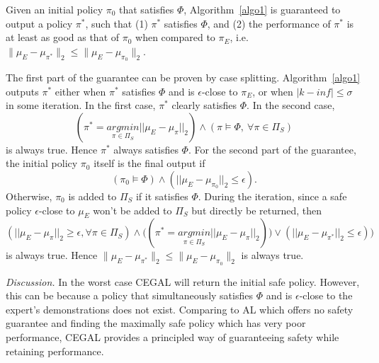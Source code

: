 \begin{theorem}
Given an initial policy $\pi_0$ that satisfies $\Phi$, Algorithm~\ref{algo1} is guaranteed to output a policy $\pi^*$, such that (1) $\pi^*$ satisfies $\Phi$, and 
(2) the performance of $\pi^*$ is at least as good as that of $\pi_0$ when compared to $\pi_E$, i.e. $\|\mu_E - \mu_{\pi^*}\|_2\leq\|\mu_E - \mu_{\pi_0}\|_2$. 
\end{theorem}
The first part of the guarantee can be proven by case splitting. Algorithm~\ref{algo1} outputs $\pi^*$ either when $\pi^*$ satisfies $\Phi$ and is {$\epsilon$-close} to $\pi_E$, or when $|k-inf|\leq \sigma$ in some iteration. 
In the first case, $\pi^*$ clearly satisfies $\Phi$. 
In the second case,  
\begin{equation}
(\pi^*=\underset{{\pi}\in\Pi_S}{argmin}||\mu_E - \mu_{{\pi}}||_2)\wedge(\pi\models\Phi,\ \forall\pi\in\Pi_S)
\end{equation}
is always true. Hence $\pi^*$ always satisfies $\Phi$. For the second part of the guarantee, the initial policy $\pi_0$ itself is the final output if
\begin{equation}
(\pi_0\models\Phi)\wedge(||\mu_E-\mu_{\pi_0}||_2\leq\epsilon). 
\end{equation}
Otherwise, $\pi_0$ is added to $\Pi_S$ if it satisfies $\Phi$.  
During the iteration, since a safe policy $\epsilon$-close to $\mu_E$ won't be added to $\Pi_S$ but directly be returned, then
\begin{equation}
(||\mu_E-\mu_{\pi}||_2\geq\epsilon, \forall\pi\in\Pi_S)\wedge\big((\pi^*=\underset{{\pi}\in\Pi_S}{argmin}||\mu_E - \mu_{{\pi}}||_2)\big)\vee(||\mu_E-\mu_{\pi^*}||_2\leq\epsilon)\big) 
\end{equation}
is always true. Hence $\|\mu_E -  \mu_{\pi^*}\|_2\leq\|\mu_E - \mu_{\pi_0}\|_2$ is always true. 
\noindent

{\it Discussion.} In the worst case CEGAL will return the initial safe policy. However, this can be because a policy that simultaneously satisfies $\Phi$ and is $\epsilon$-close to the expert's demonstrations does not exist. Comparing to AL which offers no safety guarantee and finding the maximally safe policy which has very poor performance, CEGAL provides a principled way of guaranteeing safety while retaining performance.

\noindent
